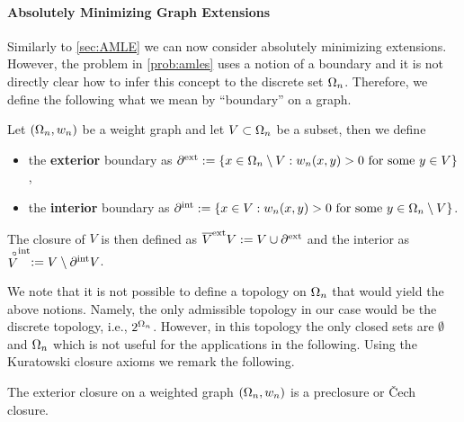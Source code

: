 \paragraph{Absolutely Minimizing Graph Extensions}
%
Similarly to \cref{sec:AMLE} we can now consider absolutely minimizing extensions. However, the problem in 
\cref{prob:amles} uses a notion of a boundary and it is not directly clear how to infer this concept to the discrete set $\Omega_n$. Therefore, we define the following what we mean by \enquote{boundary} on a graph.
%
\begin{definition}{}{}
Let $(\Omega_n, w_n)$ be a weight graph and let $V\subset\Omega_n$ be a subset, then we define
%
\begin{itemize}
\item the \textbf{exterior} boundary as $\partial^{\text{ext}} :=\{x\in \Omega_n\setminus V: w_n(x,y) > 0 \text{ for some } y\in V\}$,
\item the \textbf{interior} boundary as $\partial^{\text{int}} :=\{x\in V: w_n(x,y) > 0 \text{ for some } y\in \Omega_n\setminus V\}$.
\end{itemize}
%
The closure of $V$ is then defined as $\overline{V}^{\text{ext}} V := V\cup \partial^{\text{ext}}$ and the interior as 
$\stackrel{\circ}{V}^{\text{int}}:= V\setminus \partial^{\text{int}} V$.
\end{definition}
%
%
We note that it is not possible to define a topology on $\Omega_n$ that would yield the above notions. Namely, the only admissible topology in our case would be the discrete topology, i.e., $2^{\Omega_n}$. However, in this topology the only closed sets are $\emptyset$ and $\Omega_n$ which is not useful for the applications in the following. Using the Kuratowski closure axioms \cite{kuratowski1922operation} we remark the following.
%
\begin{lemma}{}{}
The exterior closure on a weighted graph $(\Omega_n, w_n)$ is a preclosure or Čech closure.
\end{lemma}
%
